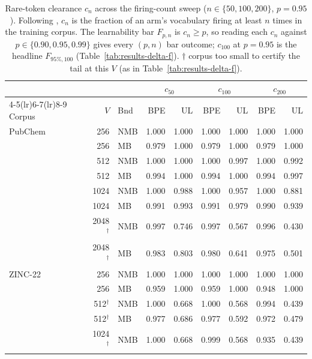 \begin{table}[htbp]
  \centering
  \caption{Rare-token clearance $c_n$ across the firing-count sweep ($n \in \{50,100,200\}$, $p{=}0.95$). Following \citet{gowda2020optimal-vocab-nmt}, $c_n$ is the fraction of an arm's vocabulary firing at least $n$ times in the training corpus. The learnability bar $F_{p,n}$ is $c_n \ge p$, so reading each $c_n$ against $p \in \{0.90, 0.95, 0.99\}$ gives every $(p,n)$ bar outcome; $c_{100}$ at $p{=}0.95$ is the headline $F_{95\%,100}$ (Table~\ref{tab:results-delta-f}). $\dagger$ corpus too small to certify the tail at this $V$ (as in Table~\ref{tab:results-delta-f}).}
  \label{tab:results-nsweep}
  \footnotesize
  \begin{tabular}{@{}l r l r r r r r r@{}}
    \toprule
    & & & \multicolumn{2}{c}{$c_{50}$} & \multicolumn{2}{c}{$c_{100}$} & \multicolumn{2}{c}{$c_{200}$} \\
    \cmidrule(lr){4-5}\cmidrule(lr){6-7}\cmidrule(lr){8-9}
    Corpus & $V$ & Bnd & BPE & UL & BPE & UL & BPE & UL \\
    \midrule
    PubChem & 256 & NMB & 1.000 & 1.000 & 1.000 & 1.000 & 1.000 & 1.000 \\
     & 256 & MB & 0.979 & 1.000 & 0.979 & 1.000 & 0.979 & 1.000 \\
     & 512 & NMB & 1.000 & 1.000 & 1.000 & 0.997 & 1.000 & 0.992 \\
     & 512 & MB & 0.994 & 1.000 & 0.994 & 1.000 & 0.994 & 0.997 \\
     & 1024 & NMB & 1.000 & 0.988 & 1.000 & 0.957 & 1.000 & 0.881 \\
     & 1024 & MB & 0.991 & 0.993 & 0.991 & 0.979 & 0.990 & 0.939 \\
     & 2048$^{\dagger}$ & NMB & 0.997 & 0.746 & 0.997 & 0.567 & 0.996 & 0.430 \\
     & 2048$^{\dagger}$ & MB & 0.983 & 0.803 & 0.980 & 0.641 & 0.975 & 0.501 \\
    \addlinespace
    ZINC-22 & 256 & NMB & 1.000 & 1.000 & 1.000 & 1.000 & 1.000 & 1.000 \\
     & 256 & MB & 0.959 & 1.000 & 0.959 & 1.000 & 0.948 & 1.000 \\
     & 512$^{\dagger}$ & NMB & 1.000 & 0.668 & 1.000 & 0.568 & 0.994 & 0.439 \\
     & 512$^{\dagger}$ & MB & 0.977 & 0.686 & 0.977 & 0.592 & 0.972 & 0.479 \\
     & 1024$^{\dagger}$ & NMB & 1.000 & 0.668 & 0.999 & 0.568 & 0.935 & 0.439 \\

\end{tabular}
\end{table}

